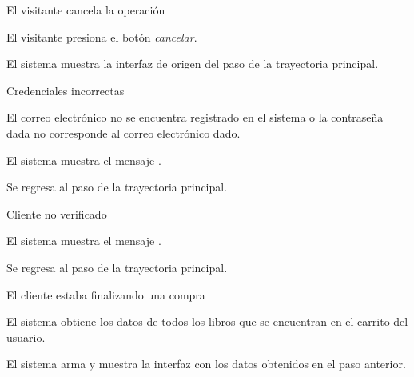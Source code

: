 {  %

  \begin{trayectoriaAlternativa}
    {El visitante cancela la operación}

    \item El visitante presiona el botón \textit{cancelar}.

    \item El sistema muestra la interfaz de origen del paso
       de la trayectoria principal.

  \end{trayectoriaAlternativa}


  \begin{trayectoriaAlternativa}
    {Credenciales incorrectas}

    \item El correo electrónico no se encuentra registrado en el sistema o la
      contraseña dada no corresponde al correo electrónico dado.

    \item El sistema muestra el mensaje
      .

    \item Se regresa al paso  de la trayectoria
      principal.

  \end{trayectoriaAlternativa}


  \begin{trayectoriaAlternativa}
    {Cliente no verificado}

    \item El sistema muestra el mensaje
      .

    \item Se regresa al paso  de la trayectoria
      principal.

  \end{trayectoriaAlternativa}


  \begin{trayectoriaAlternativa}
    {El cliente estaba finalizando una compra}

    \item El sistema obtiene los datos de todos los libros que se encuentran en
      el carrito del usuario.

    \item El sistema arma y muestra la interfaz
       con los datos obtenidos en el paso
      anterior.

  \end{trayectoriaAlternativa}
}
